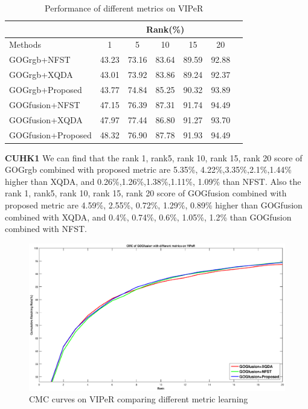 \documentclass[conference,compsoc]{IEEEtran}
\begin{document}
\begin{table}[H]
\caption{Performance of different metrics on VIPeR}
\centering
 \begin{tabular}{|l|c|c|c|c|c|c|}
\hline
& \multicolumn{5}{|c|}{Rank(\%)} \\
\hline
Methods& 1 & 5 &10& 15&20\\
\hline
GOGrgb+NFST& 43.23&73.16 &83.64 & 89.59&92.88\\  
\hline
GOGrgb+XQDA& 43.01&73.92&83.86& 89.24& 92.37\\
\hline
GOGrgb+Proposed&43.77 &74.84&85.25&90.32&93.89\\   %
\hline
GOGfusion+NFST&47.15& 76.39&87.31&91.74&94.49\\
\hline
GOGfusion+XQDA& 47.97& 77.44& 86.80& 91.27&93.70\\  
\hline
GOGfusion+Proposed&48.32&76.90&87.78&91.93&94.49\\ %
\hline

\end{tabular}
\end{table}
\textbf{CUHK1} We can find that the rank 1, rank5, rank 10, rank 15, rank 20 score of GOGrgb combined with proposed metric are 5.35\%, 4.22\%,3.35\%,2.1\%,1.44\% higher than XQDA, and 0.26\%,1.26\%,1.38\%,1.11\%, 1.09\% than NFST.  Also the  rank 1, rank5, rank 10, rank 15, rank 20 score of GOGfusion combined with proposed metric are 4.59\%, 2.55\%, 0.72\%, 1.29\%, 0.89\% higher than GOGfusion combined with XQDA, and 0.4\%, 0.74\%, 0.6\%, 1.05\%, 1.2\% than GOGfusion combined with NFST. 

\begin{figure}
\begin{raggedleft}
\includegraphics[width=1\linewidth]{VIPeR.eps}
\vspace{-3em}
\caption{CMC curves on VIPeR comparing different metric learning}
\end{raggedleft}
\end{figure}
\end{document}
